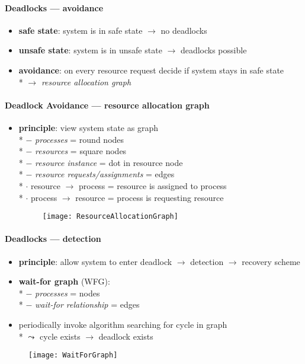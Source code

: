 \paragraph{Deadlocks --- avoidance}
\begin{itemize}
  \item \textbf{safe state}: system is in safe state $ \to $ no deadlocks
  \item \textbf{unsafe state}: system is in unsafe state $ \to $ deadlocks possible
  \item \textbf{avoidance}: on every resource request decide if system stays in safe state \\*
    $ \to $ \emph{resource allocation graph}
\end{itemize}

\paragraph{Deadlock Avoidance --- resource allocation graph}
\begin{itemize}
  \item \textbf{principle}: view system state as graph \\*
    $ - $ \emph{processes} = round nodes \\*
    $ - $ \emph{resources} = square nodes \\*
    $ - $ \emph{resource instance} = dot in resource node \\*
    $ - $ \emph{resource requests/assignments} = edges \\*
    \phantom{$ - $} $ \cdot $ resource $ \to $ process = resource is assigned to process \\*
    \phantom{$ - $} $ \cdot $ process $ \to $ resource = process is requesting resource
  \begin{figure}[h]\centering\label{ResourceAllocationGraph}\texttt{[image: ResourceAllocationGraph]}\end{figure}
\end{itemize}

\paragraph{Deadlocks --- detection}
\begin{itemize}
  \item \textbf{principle}: allow system to enter deadlock $ \to $ detection $ \to $ recovery scheme
  \item \textbf{wait-for graph} (WFG): \\*
    $ - $ \emph{processes} = nodes \\*
    $ - $ \emph{wait-for relationship} = edges
  \item periodically invoke algorithm searching for cycle in graph \\*
    $ \leadsto $ cycle exists $ \to $ deadlock exists
\end{itemize}
\begin{figure}[h]\centering\label{WaitForGraph}\texttt{[image: WaitForGraph]}\end{figure}

